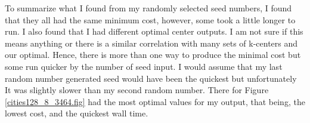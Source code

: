 \documentclass[12pt]{article}
\begin{document}
\begin{enumerate}
To summarize what I found from my randomly selected seed numbers, I found that they all had the same minimum cost, however, some took a little longer to run. I also found that I had different optimal center outputs. I am not sure if this means anything or there is a similar correlation with many sets of k-centers and our optimal. Hence, there is more than one way to produce the minimal cost but some run quicker by the number of seed input. I would assume that my last random number generated seed would have been the quickest but unfortunately It was slightly slower than my second random number. There for Figure \ref{cities128_8_3464.fig} had the most optimal values for my output, that being, the lowest cost, and the quickest wall time. 

\end{enumerate}


\end{document}
